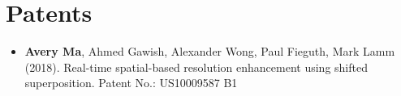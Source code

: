 \section*{Patents}
    \vspace{\postsubhead}
    \begin{adjustwidth}{\indentleft}{\indentright}
    \begin{itemize}
        \item \textbf{Avery Ma}, Ahmed Gawish, Alexander Wong, Paul Fieguth, Mark Lamm (2018). Real-time spatial-based resolution enhancement using shifted superposition. Patent No.: US10009587 B1
      \end{itemize}
    \end{adjustwidth}
    \vspace{\postsection}